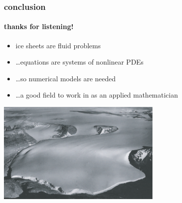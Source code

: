 \documentclass[10pt,hyperref={pdfpagelabels=true}]{beamer}
\begin{document}
\begin{frame}
  \frametitle{conclusion}
  \framesubtitle{thanks for listening!}

\begin{itemize}
\item ice sheets are fluid problems
\item \dots equations are systems of nonlinear PDEs
\item \dots so numerical models are needed
\item \dots a good field to work in as an applied mathematician
\end{itemize}

\begin{center}
\includegraphics[width=0.6\textwidth]{polaris}
\end{center}
\end{frame}
\end{document}
